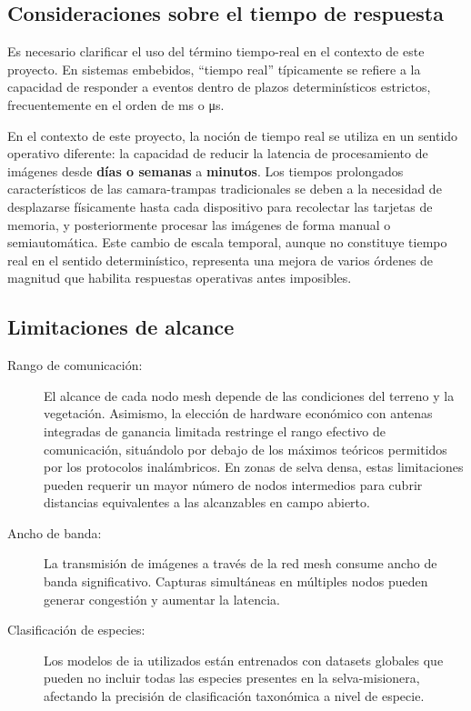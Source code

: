 \documentclass[a4paper, 12pt]{report}
\begin{document}
\subsection{Consideraciones sobre el tiempo de respuesta}

Es necesario clarificar el uso del término \gls{tiempo-real} en el contexto de
este proyecto. En sistemas embebidos, ``tiempo real'' típicamente se refiere a
la capacidad de responder a eventos dentro de plazos determinísticos estrictos,
frecuentemente en el orden de \unit{\ms} o \unit{\us}.

En el contexto de este proyecto, la noción de tiempo real se utiliza en un
sentido operativo diferente: la capacidad de reducir la latencia de
procesamiento de imágenes desde \textbf{días o semanas} a \textbf{minutos}.
Los tiempos prolongados característicos de las \glspl{camara-trampa} tradicionales
se deben a la necesidad de desplazarse físicamente hasta cada dispositivo para
recolectar las tarjetas de memoria, y posteriormente procesar las imágenes de
forma manual o semiautomática. Este cambio de escala temporal, aunque no
constituye tiempo real en el sentido determinístico, representa una mejora
de varios órdenes de magnitud que habilita respuestas operativas antes imposibles.

\subsection{Limitaciones de alcance}

\begin{description}
  \item[Rango de comunicación:] El alcance de cada nodo \gls{mesh} depende
    de las condiciones del terreno y la vegetación. Asimismo, la elección
    de hardware económico con antenas integradas de ganancia limitada
    restringe el rango efectivo de comunicación, situándolo por debajo de
    los máximos teóricos permitidos por los protocolos inalámbricos. En
    zonas de selva densa, estas limitaciones pueden requerir un mayor
    número de nodos intermedios para cubrir distancias equivalentes a las
    alcanzables en campo abierto.

  \item[Ancho de banda:] La transmisión de imágenes a través de la red
    \gls{mesh} consume ancho de banda significativo. Capturas simultáneas
    en múltiples nodos pueden generar congestión y aumentar la latencia.

  \item[Clasificación de especies:] Los modelos de \gls{ia} utilizados están
    entrenados con datasets globales que pueden no incluir todas las
    especies presentes en la \gls{selva-misionera}, afectando la precisión
    de clasificación taxonómica a nivel de especie.
\end{description}
\end{document}
